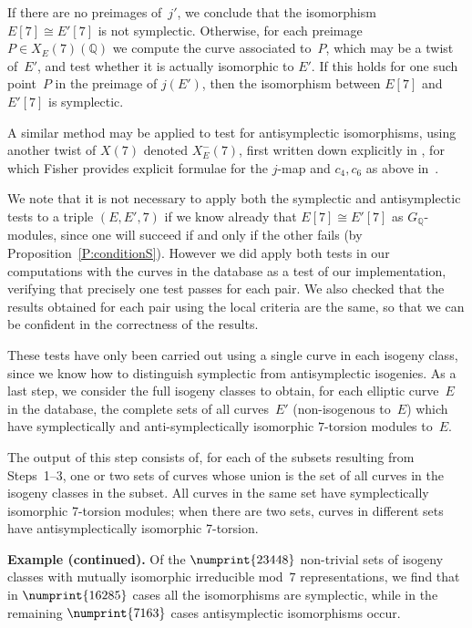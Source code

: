 \documentclass[12pt, reqno]{amsart}
\newcommand{\Q}{\mathbb{Q}}
\numberwithin{equation}{section}
\theoremstyle{definition}
\theoremstyle{remark}
\begin{document}
If there are no preimages of~$j'$, we conclude that the isomorphism
$E[7]\cong E'[7]$ is not symplectic.  Otherwise, for each preimage
$P\in X_E(7)(\Q)$ we compute the curve associated to~$P$, which may be
a twist of~$E'$, and test whether it is actually isomorphic to $E'$.
If this holds for one such point~$P$ in the preimage of $j(E')$, then
the isomorphism between $E[7]$ and $E'[7]$ is symplectic.

A similar method may be applied to test for antisymplectic
isomorphisms, using another twist of $X(7)$ denoted $X_E^-(7)$, first
written down explicitly in \cite{PSS}, for which Fisher provides
explicit formulae for the $j$-map and $c_4,c_6$ as above
in~\cite{Fisher}.

We note that it is not necessary to apply both the symplectic and
antisymplectic tests to a triple $(E,E',7)$ if we know already that
$E[7]\cong E'[7]$ as $G_\Q$-modules, since one will succeed if and only if the other
fails (by Proposition~\ref{P:conditionS}).  However we did apply both
tests in our computations with the curves in the database as a test of
our implementation, verifying that precisely one test passes for each
pair.  We also checked that the results obtained for each pair using
the local criteria are the same, so that we can be confident in the
correctness of the results.

These tests have only been carried out using a single curve in each
isogeny class, since we know how to distinguish symplectic from
antisymplectic isogenies.  As a last step, we consider the full isogeny classes
to obtain, for each elliptic curve~$E$ in the database, the complete sets of all curves~$E'$ (non-isogenous to~$E$) which have
symplectically and anti-symplectically isomorphic $7$-torsion modules to~$E$.

The output of this step consists of, for each of the subsets resulting
from Steps~1--3, one or two sets of curves whose union is the set of
all curves in the isogeny classes in the subset.  All curves in the
same set have symplectically isomorphic 7-torsion modules; when there
are two sets, curves in different sets have antisymplectically
isomorphic 7-torsion.




{\bf Example (continued).}  Of the $\numprint{23448}$ non-trivial sets
of isogeny classes with mutually isomorphic irreducible mod~$7$
representations, we find that in $\numprint{16285}$ cases all the
isomorphisms are symplectic, while in the remaining $\numprint{7163}$
cases antisymplectic isomorphisms occur.
\end{document}
